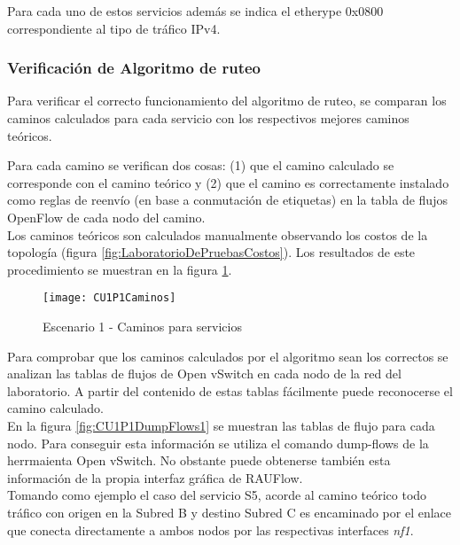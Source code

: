 Para cada uno de estos servicios adem\'as se indica el etherype 0x0800 correspondiente al tipo de tr\'afico IPv4.\\

\subsubsection{Verificaci\'on de Algoritmo de ruteo}
Para verificar el correcto funcionamiento del algoritmo de ruteo, se comparan los caminos calculados para cada servicio con los respectivos mejores caminos te\'oricos. 

Para cada camino se verifican dos cosas: (1) que el camino calculado se corresponde con el camino te\'orico y (2) que el camino es correctamente instalado como reglas de reenvío (en base a conmutaci\'on de etiquetas) en la tabla de flujos OpenFlow de cada nodo del camino.\\

Los caminos te\'oricos son calculados manualmente observando los costos de la topolog\'ia (figura \ref{fig:LaboratorioDePruebasCostos}). Los resultados de este procedimiento se muestran en la figura
 \ref{fig:CUP1Caminos}.\\

\begin{figure}[ht!] 
\centering    
\texttt{[image: CU1P1Caminos]}
\caption[Escenario 1 - Caminos para servicios]{Escenario 1 - Caminos para servicios}
\label{fig:CUP1Caminos}
\end{figure}

Para comprobar que los caminos calculados por el algoritmo sean los correctos se analizan las tablas de flujos de Open vSwitch en cada nodo de la red del laboratorio. A partir del contenido de estas tablas fácilmente puede reconocerse el camino calculado.\\

En la figura \ref{fig:CU1P1DumpFlows1} se muestran las tablas de flujo para cada nodo. Para conseguir esta informaci\'on se utiliza el comando dump-flows de la herrmaienta Open vSwitch. No obstante puede obtenerse tambi\'en esta informaci\'on de la propia interfaz gr\'afica de RAUFlow.\\

Tomando como ejemplo el caso del servicio S5, acorde al camino te\'orico todo tr\'afico con origen en la Subred B y destino Subred C es encaminado por el enlace que conecta directamente a ambos nodos por las respectivas interfaces \textit{nf1}. 

